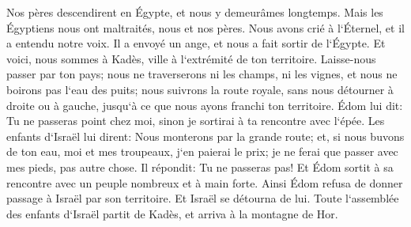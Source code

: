 \verse Nos pères descendirent en Égypte, et nous y demeurâmes longtemps. Mais les Égyptiens nous ont maltraités, nous et nos pères. 
\verse Nous avons crié à l`Éternel, et il a entendu notre voix. Il a envoyé un ange, et nous a fait sortir de l`Égypte. Et voici, nous sommes à Kadès, ville à l`extrémité de ton territoire. 
\verse Laisse-nous passer par ton pays; nous ne traverserons ni les champs, ni les vignes, et nous ne boirons pas l`eau des puits; nous suivrons la route royale, sans nous détourner à droite ou à gauche, jusqu`à ce que nous ayons franchi ton territoire. 
\verse Édom lui dit: Tu ne passeras point chez moi, sinon je sortirai à ta rencontre avec l`épée. 
\verse Les enfants d`Israël lui dirent: Nous monterons par la grande route; et, si nous buvons de ton eau, moi et mes troupeaux, j`en paierai le prix; je ne ferai que passer avec mes pieds, pas autre chose. 
\verse Il répondit: Tu ne passeras pas! Et Édom sortit à sa rencontre avec un peuple nombreux et à main forte. 
\verse Ainsi Édom refusa de donner passage à Israël par son territoire. Et Israël se détourna de lui. 
\verse Toute l`assemblée des enfants d`Israël partit de Kadès, et arriva à la montagne de Hor. 
